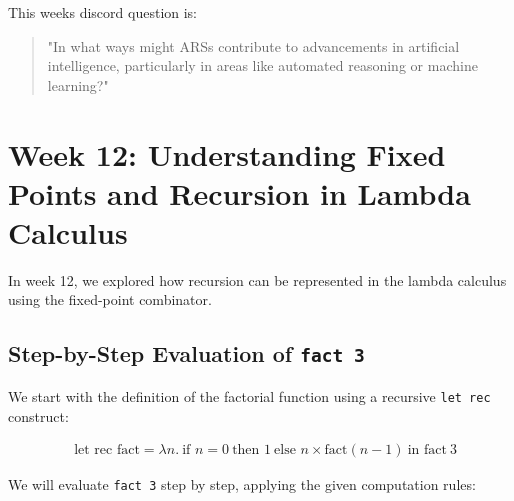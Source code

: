 \documentclass{article}
\begin{document}
This weeks discord question is:

\begin{quote}
\small
 "In what ways might ARSs contribute to advancements in artificial intelligence, particularly in areas like automated reasoning or machine learning?"
\end{quote}

\section{Week 12: Understanding Fixed Points and Recursion in Lambda Calculus}
\label{sec:week12}

In week 12, we explored how recursion can be represented in the lambda calculus using the fixed-point combinator. 

\subsection*{Step-by-Step Evaluation of \texttt{fact 3}}

We start with the definition of the factorial function using a recursive \texttt{let rec} construct:

\begin{equation*}
\begin{split}
& \text{let rec } \text{fact} = \lambda n.\ \text{if } n = 0\ \text{then } 1\ \text{else } n \times \text{fact}(n - 1)\ \text{in }\text{fact}\ 3
\end{split}
\end{equation*}

We will evaluate \texttt{fact 3} step by step, applying the given computation rules:
\end{document}
